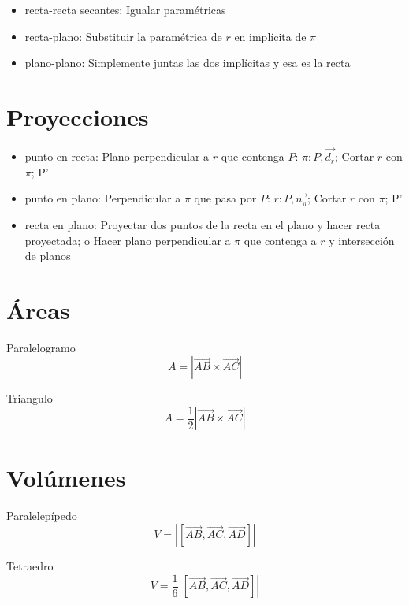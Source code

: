 \documentclass[12pt, letterpaper, twoside]{article}
\begin{document}
	\begin{itemize}
		\item recta-recta secantes:
		Igualar paramétricas
		
		\item recta-plano:
		Substituir la paramétrica de $r$ en implícita de $\pi$
		
		\item plano-plano:
		Simplemente juntas las dos implícitas y esa es la recta
	\end{itemize}

	\section{Proyecciones}
	
	\begin{itemize}
		\item punto en recta:
		Plano perpendicular a $r$ que contenga $P$: $\pi: P, \vec{d_r}$;
		Cortar $r$ con $\pi$; P'
		
		\item punto en plano:
		Perpendicular a $\pi$ que pasa por $P$: $r: P, \vec{n_\pi}$;
		Cortar $r$ con $\pi$; P'
		
		\item recta en plano:
		Proyectar dos puntos de la recta en el plano y hacer recta proyectada; 
		o Hacer plano perpendicular a $\pi$ que contenga a $r$ y intersección de planos
	\end{itemize}


	\section{Áreas}
	
	Paralelogramo
	\begin{equation}
		A = |\vec{AB} \times \vec{AC}|
	\end{equation}
	
	Triangulo
	\begin{equation}
		A = \frac{1}{2} |\vec{AB} \times \vec{AC}|
	\end{equation}


	\section{Volúmenes}

	Paralelepípedo
	\begin{equation}
		V = |[\vec{AB}, \vec{AC}, \vec{AD}]|
	\end{equation}
	
	Tetraedro 
	\begin{equation}
		V = \frac{1}{6} |[\vec{AB}, \vec{AC}, \vec{AD}]|
	\end{equation}

	
\end{document}
